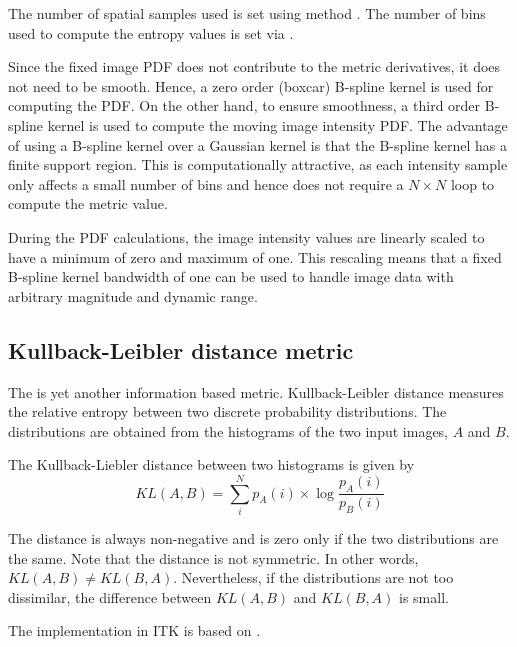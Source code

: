 
The number of spatial samples used is set using method 
. The number of bins used to compute
the entropy values is set via .

Since the fixed image PDF does not contribute to the metric derivatives, it
does not need to be smooth. Hence, a zero order (boxcar) B-spline kernel is
used for computing the PDF. On the other hand, to ensure smoothness, a third
order B-spline kernel is used to compute the moving image intensity PDF. The
advantage of using a B-spline kernel over a Gaussian kernel is that the
B-spline kernel has a finite support region. This is computationally
attractive, as each intensity sample only affects a small number of bins and
hence does not require a $N \times N$ loop to compute the metric value.

During the PDF calculations, the image intensity values are linearly scaled
to have a minimum of zero and maximum of one. This rescaling means that a
fixed B-spline kernel bandwidth of one can be used to handle image data with
arbitrary magnitude and dynamic range.


\subsection{Kullback-Leibler distance metric}
The  is yet another information based metric. 
Kullback-Leibler distance measures the relative entropy between two 
discrete probability distributions. The distributions are obtained from the 
histograms of the two input images, $A$ and $B$. 

The Kullback-Liebler distance between two histograms is given by
\begin{equation}
KL(A,B) =  \sum_i^N p_A(i) \times \log \frac{ p_A(i) }{p_B(i) }
\end{equation}

The distance is always non-negative and is zero only if the two distributions 
are the same. Note that the distance is not symmetric. In other 
words, $KL(A,B) \neq KL(B,A)$. Nevertheless, if the distributions are not too dissimilar, 
the difference between $KL(A,B)$ and $KL(B,A)$ is small.

The implementation in ITK is based on \cite{Chung2002}.

